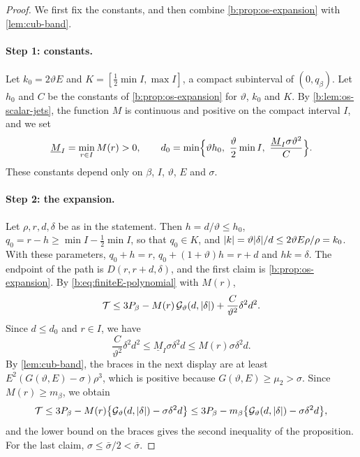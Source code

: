 \begin{proof}
We first fix the constants, and then combine \cref{b:prop:os-expansion} with
\cref{lem:cub-band}.

\paragraph{Step 1: constants.} Let $k_0=2\vartheta E$ and
$K=[\frac12\min I,\max I]$, a compact subinterval of $(0,q_\beta)$. Let $h_0$
and $C$ be the constants of \cref{b:prop:os-expansion} for $\vartheta$, $k_0$
and $K$. By \cref{b:lem:os-scalar-jets}, the function $M$ is continuous and
positive on the compact interval $I$, and we set
\[
 \underline M_I=\min_{r\in I}M(r)>0,\qquad
 d_0=\min\Bigl\{\vartheta h_0,\ \frac\vartheta2\min I,\
 \frac{\underline M_I\sigma\vartheta^2}C\Bigr\}.
\]
These constants depend only on $\beta$, $I$, $\vartheta$, $E$ and $\sigma$.

\paragraph{Step 2: the expansion.} Let $\rho,r,d,\delta$ be as in the
statement. Then $h=d/\vartheta\le h_0$, $q_0=r-h\ge\min I-\frac12\min I$, so
that $q_0\in K$, and $\lvert k\rvert=\vartheta\lvert \delta\rvert/d\le2\vartheta E\rho/\rho=k_0$.
With these parameters, $q_0+h=r$, $q_0+(1+\vartheta)h=r+d$ and $hk=\delta$. The
endpoint of the path is $D(r,r+d,\delta)$, and the first claim is
\cref{b:prop:os-expansion}. By \eqref{b:eq:finiteE-polynomial} with $M(r)$,
\[
 \mathcal T\le3P_\beta-M(r)\,\mathcal G_\vartheta(d,\lvert \delta\rvert)+\frac C{\vartheta^2}\delta^2d^2.
\]
Since $d\le d_0$ and $r\in I$, we have
\[
 \frac C{\vartheta^2}\delta^2d^2\le\underline M_I\sigma\delta^2d\le M(r)\sigma\delta^2d.
\]
By \cref{lem:cub-band}, the braces in the next display are at least
$E^2(G(\vartheta,E)-\sigma)\rho^3$, which is positive because
$G(\vartheta,E)\ge\mu_2>\sigma$. Since $M(r)\ge m_\beta$, we obtain
\[
 \mathcal T\le3P_\beta-M(r)\bigl\{\mathcal G_\vartheta(d,\lvert \delta\rvert)-\sigma\delta^2d\bigr\}
 \le3P_\beta-m_\beta\bigl\{\mathcal G_\vartheta(d,\lvert \delta\rvert)-\sigma\delta^2d\bigr\},
\]
and the lower bound on the braces gives the second inequality of the
proposition. For the last claim, $\sigma\le\bar\sigma/2<\bar\sigma$.
\end{proof}

